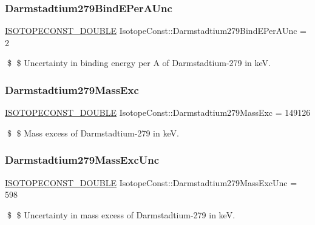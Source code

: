 \subsubsection{\texorpdfstring{Darmstadtium279\+Bind\+E\+Per\+A\+Unc}{Darmstadtium279BindEPerAUnc}}
{\footnotesize\ttfamily \mbox{\hyperlink{group___isotope_const-_macros_ga8f45a7272ce02c0b4c65c44636ed719a}{I\+S\+O\+T\+O\+P\+E\+C\+O\+N\+S\+T\+\_\+\+D\+O\+U\+B\+LE}} Isotope\+Const\+::\+Darmstadtium279\+Bind\+E\+Per\+A\+Unc = 2}

\$ \$ Uncertainty in binding energy per A of Darmstadtium-\/279 in keV. \mbox{\label{group___isotope_const-_darmstadtium-_ds279_gacafe64a680f686a2bdce13a12fd33cbd}} 
\subsubsection{\texorpdfstring{Darmstadtium279\+Mass\+Exc}{Darmstadtium279MassExc}}
{\footnotesize\ttfamily \mbox{\hyperlink{group___isotope_const-_macros_ga8f45a7272ce02c0b4c65c44636ed719a}{I\+S\+O\+T\+O\+P\+E\+C\+O\+N\+S\+T\+\_\+\+D\+O\+U\+B\+LE}} Isotope\+Const\+::\+Darmstadtium279\+Mass\+Exc = 149126}

\$ \$ Mass excess of Darmstadtium-\/279 in keV. \mbox{\label{group___isotope_const-_darmstadtium-_ds279_gaa5a00e32fdda882d5543251fa06f5526}} 
\subsubsection{\texorpdfstring{Darmstadtium279\+Mass\+Exc\+Unc}{Darmstadtium279MassExcUnc}}
{\footnotesize\ttfamily \mbox{\hyperlink{group___isotope_const-_macros_ga8f45a7272ce02c0b4c65c44636ed719a}{I\+S\+O\+T\+O\+P\+E\+C\+O\+N\+S\+T\+\_\+\+D\+O\+U\+B\+LE}} Isotope\+Const\+::\+Darmstadtium279\+Mass\+Exc\+Unc = 598}

\$ \$ Uncertainty in mass excess of Darmstadtium-\/279 in keV. \mbox{\label{group___isotope_const-_darmstadtium-_ds279_ga85c2813c59981263854e6303f7a153e1}} 
